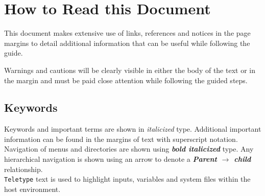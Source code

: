 \section{How to Read this Document}
This document makes extensive use of links, references and notices in the page margins to detail additional information that can be useful while following the guide. \\


\noindent
Warnings and cautions will be clearly visible in either the body of the text or in the margin and must be paid close attention while following the guided steps. \\




\subsection{Keywords}
Keywords and important terms are shown in \textit{italicized} type. Additional important information can be found in the margins of text with superscript notation. \\

\noindent
Navigation of menus and directories are shown using \textbf{\textit{bold italicized}} type. Any hierarchical navigation is shown using an arrow to denote a \textbf{\textit{Parent $\rightarrow$ child}} relationship. \\

\noindent
\texttt{Teletype} text is used to highlight inputs, variables and system files within the host environment.\newpage